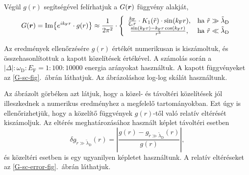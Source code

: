 \documentclass[a4paper,12pt,titlepage]{article}
\newcommand{\RR}{{\vb*{r}}}
\newcommand{\kF}{{k_\text{F}}}
\newcommand{\EF}{{E_\text{F}}}
\begin{document}
Végül $g(r)$ segítségével felírhatjuk a $G(\RR)$ függvény alakját,
\begin{equation}
	G(\RR) = \Im{ e^{i \kF r} \cdot g(r) } \approx \frac{1}{2 \pi^2} \cdot \left\{ \begin{array}{cl}
		\frac{\kF}{\xi_\text{c} r} \cdot K_1(\tilde{r}) \cdot \sin(\kF r), & \text{ha } \tilde{r} \gg \tilde{\lambda}_\text{D} \\
		\frac{\sin(\kF r) - \kF r \cos(\kF r)}{r^3}, & \text{ha } \tilde{r} \ll \tilde{\lambda}_\text{D}
	\end{array} \right.
\end{equation}

Az eredmények ellenőrzésére $g(r)$ értékét numerikusan is kiszámoltuk, és összehasonlítottuk a kapott közelítések értékével.  A számolás során a $\left| \Delta \right| : \omega_\text{D} : \EF = 1 : 100 : 10000$ energia arányokat használtuk.  A kapott függvényeket az \ref{G-sc-fig}.\ ábrán láthatjuk.  Az ábrázoláshoz log-log skálát használtunk.

Az ábrázolt görbéken azt látjuk, hogy a közel- és távoltéri közelítések jól illeszkednek a numerikus eredményhez a megfelelő tartományokban.  Ezt úgy is ellenőrizhetjük, hogy a közelítő függvények $g(r)$-től való relatív eltérését kiszámoljuk.  Az eltérés meghatározásához használt képlet távoltéri esetben
$$ \delta g_{\tilde{r} \gg \tilde{\lambda}_\text{D}}(r) = \left| \frac{g(r) - g_{\tilde{r} \gg \tilde{\lambda}_\text{D}}(r)}{g(r)} \right|, $$
és közeltéri esetben is egy ugyanilyen képletet használtunk.  A relatív eltéréseket az \ref{G-sc-error-fig}.\ ábrán láthatjuk.
\end{document}
